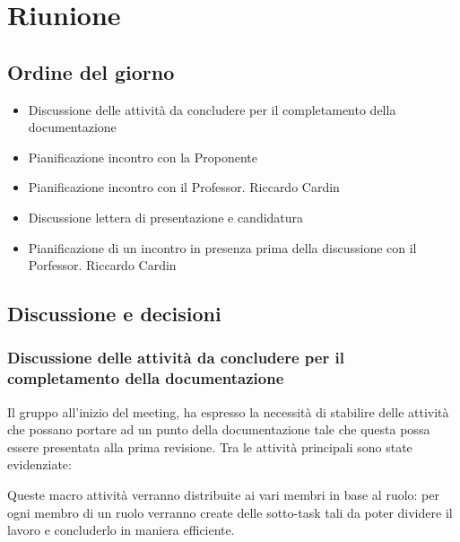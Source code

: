\section{Riunione}
\subsection{Ordine del giorno}
\begin{itemize}
	\item Discussione delle attività da concludere per il completamento della documentazione
	\item Pianificazione incontro con la Proponente
	\item Pianificazione incontro con il Professor. Riccardo Cardin
	\item Discussione lettera di presentazione e candidatura \RTB
	\item Pianificazione di un incontro in presenza prima della discussione con il Porfessor. Riccardo Cardin
\end{itemize}

\subsection{Discussione e decisioni}
\subsubsection{Discussione delle attività da concludere per il completamento della documentazione}
\par Il gruppo all'inizio del meeting, ha espresso la necessità di stabilire delle attività che possano portare ad un punto della documentazione tale che questa possa essere presentata alla prima revisione. 
Tra le attività principali sono state evidenziate:
\par Queste macro attività verranno distribuite ai vari membri in base al ruolo: per ogni membro di un ruolo verranno create delle sotto-task tali da poter dividere il lavoro e concluderlo in maniera efficiente.

